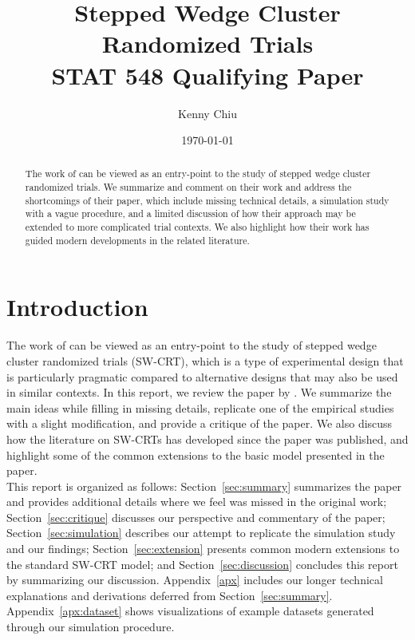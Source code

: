 \documentclass[10pt]{article}
\title{Stepped Wedge Cluster Randomized Trials\\\vspace{0.5em}\large{STAT 548 Qualifying Paper}}
\author{Kenny Chiu}
\date{\today}
\begin{document}
\maketitle

\vspace{2em}

\begin{abstract}
The work of \textcite{Hussey:2007} can be viewed as an entry-point to the study of stepped wedge cluster randomized trials. We summarize and comment on their work and address the shortcomings of their paper, which include missing technical details, a simulation study with a vague procedure, and a limited discussion of how their approach may be extended to more complicated trial contexts. We also highlight how their work has guided modern developments in the related literature.
\end{abstract}

\vspace{2em}


\section{Introduction}

The work of \textcite{Hussey:2007} can be viewed as an entry-point to the study of stepped wedge cluster randomized trials (SW-CRT), which is a type of experimental design that is particularly pragmatic compared to alternative designs that may also be used in similar contexts. In this report, we review the paper by \citeauthor{Hussey:2007}. We summarize the main ideas while filling in missing details, replicate one of the empirical studies with a slight modification, and provide a critique of the paper. We also discuss how the literature on SW-CRTs has developed since the paper was published, and highlight some of the common extensions to the basic model presented in the paper.
\\

This report is organized as follows: Section~\ref{sec:summary} summarizes the paper and provides additional details where we feel was missed in the original work; Section~\ref{sec:critique} discusses our perspective and commentary of the paper; Section~\ref{sec:simulation} describes our attempt to replicate the simulation study and our findings; Section~\ref{sec:extension} presents common modern extensions to the standard SW-CRT model; and Section~\ref{sec:discussion} concludes this report by summarizing our discussion. Appendix~\ref{apx} includes our longer technical explanations and derivations deferred from Section~\ref{sec:summary}. Appendix~\ref{apx:dataset} shows visualizations of example datasets generated through our simulation procedure.
\end{document}
